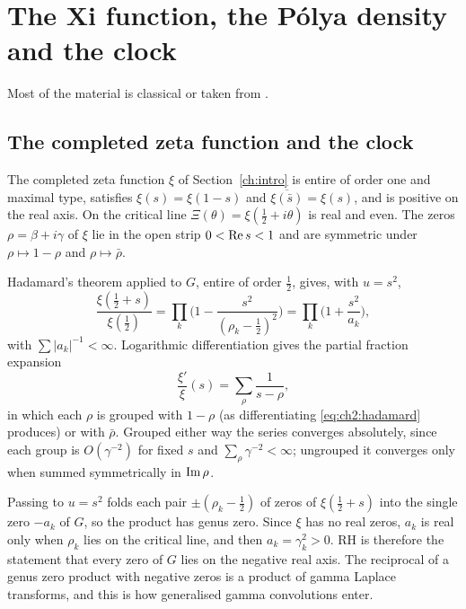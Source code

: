 \section{The Xi function, the P\'olya density and the clock}\label{ch:clock}
\label{sec:clock}

Most of the material is classical or taken from \cite{P26}.

\subsection{The completed zeta function and the clock}

The completed zeta function $\xi$ of Section~\ref{ch:intro} is entire of order one and maximal type, satisfies $\xi(s)=\xi(1-s)$ and $\overline{\xi(\bar s)}=\xi(s)$, and is positive on the real axis. On the critical line $\Xi(\theta)=\xi(\frac12+i\theta)$ is real and even. The zeros $\rho=\beta+i\gamma$ of $\xi$ lie in the open strip $0<\operatorname{Re} s<1$ and are symmetric under $\rho\mapsto1-\rho$ and $\rho\mapsto\bar\rho$.

Hadamard's theorem applied to $G$, entire of order $\frac12$, gives, with $u=s^2$,
\begin{equation}\label{eq:ch2:hadamard}
\frac{\xi(\frac12+s)}{\xi(\frac12)}=\prod_k\Big(1-\frac{s^2}{(\rho_k-\frac12)^2}\Big)=\prod_k\Big(1+\frac{s^2}{a_k}\Big),
\end{equation}
with $\sum|a_k|^{-1}<\infty$. Logarithmic differentiation gives the partial fraction expansion
\begin{equation}\label{eq:ch2:partial}
\frac{\xi'}{\xi}(s)=\sum_\rho\frac1{s-\rho},
\end{equation}
in which each $\rho$ is grouped with $1-\rho$ (as differentiating \eqref{eq:ch2:hadamard} produces) or with $\bar\rho$. Grouped either way the series converges absolutely, since each group is $O(\gamma^{-2})$ for fixed $s$ and $\sum_\rho\gamma^{-2}<\infty$; ungrouped it converges only when summed symmetrically in $\operatorname{Im}\rho$.

Passing to $u=s^2$ folds each pair $\pm(\rho_k-\frac12)$ of zeros of $\xi(\frac12+s)$ into the single zero $-a_k$ of $G$, so the product has genus zero. Since $\xi$ has no real zeros, $a_k$ is real only when $\rho_k$ lies on the critical line, and then $a_k=\gamma_k^2>0$. RH is therefore the statement that every zero of $G$ lies on the negative real axis. The reciprocal of a genus zero product with negative zeros is a product of gamma Laplace transforms, and this is how generalised gamma convolutions enter.


